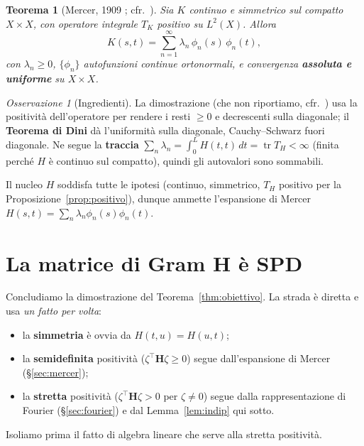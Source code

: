 \documentclass[11pt,a4paper]{article}
\theoremstyle{plain}
\newtheorem{teorema}{Teorema}
\theoremstyle{remark}
\newtheorem*{osservazione}{Osservazione}
\DeclareMathOperator{\tr}{tr}
\newcommand{\Hmat}{\mathbf{H}}
\newcommand{\transp}{^{\!\top}}
\newcommand{\Top}{T_{\!H}}
\begin{document}
\begin{teorema}[Mercer, 1909 \cite{mercer1909}; cfr.\ \cite{riesznagy1955,steinwart2008}]
\label{thm:mercer}
Sia $K$ continuo e simmetrico sul compatto $X\times X$, con operatore integrale $T_K$ positivo su
$L^2(X)$. Allora
\[
  K(s,t)=\sum_{n=1}^\infty \lambda_n\,\phi_n(s)\,\phi_n(t),
\]
con $\lambda_n\ge0$, $\{\phi_n\}$ autofunzioni continue ortonormali, e convergenza
\textbf{assoluta e uniforme} su $X\times X$.
\end{teorema}

\begin{osservazione}[Ingredienti]
La dimostrazione (che non riportiamo, cfr.\ \cite{riesznagy1955,steinwart2008}) usa la positivit\`a
dell'operatore per rendere i resti $\ge0$ e decrescenti sulla diagonale; il \textbf{Teorema di
Dini} d\`a l'uniformit\`a sulla diagonale, Cauchy--Schwarz fuori diagonale. Ne segue la
\textbf{traccia} $\sum_n\lambda_n=\int_0^L H(t,t)\,dt=\tr\Top<\infty$ (finita perch\'e $H$ \`e
continuo sul compatto), quindi gli autovalori sono sommabili.
\end{osservazione}

Il nucleo $H$ soddisfa tutte le ipotesi (continuo, simmetrico, $\Top$ positivo per la
Proposizione~\ref{prop:positivo}), dunque ammette l'espansione di Mercer
$H(s,t)=\sum_n\lambda_n\phi_n(s)\phi_n(t)$.

\section{La matrice di Gram \texorpdfstring{$\Hmat$}{H} \`e SPD}
\label{sec:spd}

Concludiamo la dimostrazione del Teorema~\ref{thm:obiettivo}. La strada \`e diretta e usa
\emph{un fatto per volta}:
\begin{itemize}
  \item la \textbf{simmetria} \`e ovvia da $H(t,u)=H(u,t)$;
  \item la \textbf{semidefinita} positivit\`a ($\zeta\transp\Hmat\zeta\ge0$) segue dall'espansione
    di Mercer (§\ref{sec:mercer});
  \item la \textbf{stretta} positivit\`a ($\zeta\transp\Hmat\zeta>0$ per $\zeta\ne0$) segue dalla
    rappresentazione di Fourier (§\ref{sec:fourier}) e dal Lemma~\ref{lem:indip} qui sotto.
\end{itemize}
Isoliamo prima il fatto di algebra lineare che serve alla stretta positivit\`a.
\end{document}
